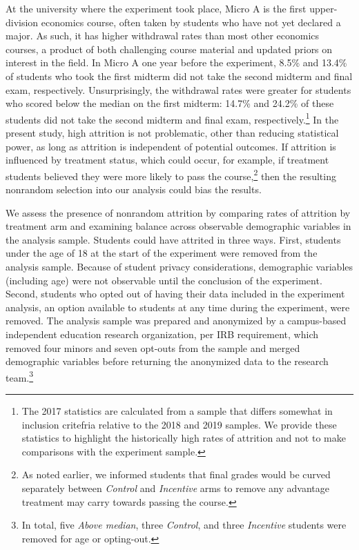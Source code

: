 \documentclass[12pt]{article}
\begin{document}
At the university where the experiment took place, Micro A is the first upper-division economics course, often taken by students who have not yet declared a major. As such, it has higher withdrawal rates than most other economics courses, a product of both challenging course material and updated priors on interest in the field. In Micro A one year before the experiment, 8.5\% and 13.4\% of students who took the first midterm did not take the second midterm and final exam, respectively. Unsurprisingly, the withdrawal rates were greater for students who scored below the median on the first midterm: 14.7\% and 24.2\% of these students did not take the second midterm and final exam, respectively.\footnote{The 2017 statistics are calculated from a sample that differs somewhat in inclusion critefria relative to the 2018 and 2019 samples. We provide these statistics to highlight the historically high rates of attrition and not to make comparisons with the experiment sample.} In the present study, high attrition is not problematic, other than reducing statistical power, as long as attrition is independent of potential outcomes. If attrition is influenced by treatment status, which could occur, for example, if treatment students believed they were more likely to pass the course,\footnote{As noted earlier, we informed students that final grades would be curved separately between \textit{Control} and \textit{Incentive} arms to remove any advantage treatment may carry towards passing the course.} then the resulting nonrandom selection into our analysis could bias the results.

We assess the presence of nonrandom attrition by comparing rates of attrition by treatment arm and examining balance across observable demographic variables in the analysis sample. Students could have attrited in three ways. First, students under the age of 18 at the start of the experiment were removed from the analysis sample. Because of student privacy considerations, demographic variables (including age) were not observable until the conclusion of the experiment. Second, students who opted out of having their data included in the experiment analysis, an option available to students at any time during the experiment, were removed. The analysis sample was prepared and anonymized by a campus-based independent education research organization, per IRB requirement, which removed four minors and seven opt-outs from the sample and merged demographic variables before returning the anonymized data to the research team.\footnote{In total, five \textit{Above median}, three \textit{Control}, and three \textit{Incentive} students were removed for age or opting-out.}
\end{document}
